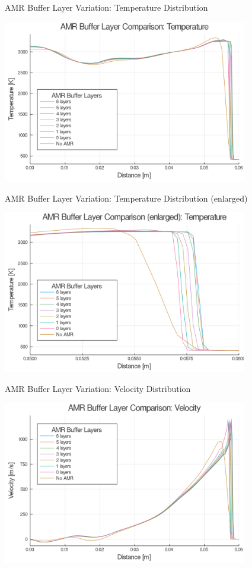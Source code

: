 \begin{frame}{AMR Buffer Layer Variation: Temperature Distribution}
\begin{center}
\includegraphics[width=0.8\textwidth]{../figs/amrfigs/amr_bufflayers/t.png}
\end{center}
\end{frame}

\begin{frame}{AMR Buffer Layer Variation: Temperature Distribution (enlarged)}
\begin{center}
\includegraphics[width=0.8\textwidth]{../figs/amrfigs/amr_bufflayers/te.png}
\end{center}
\end{frame}

\begin{frame}{AMR Buffer Layer Variation: Velocity Distribution}
\begin{center}
\includegraphics[width=0.8\textwidth]{../figs/amrfigs/amr_bufflayers/u.png}
\end{center}
\end{frame}


